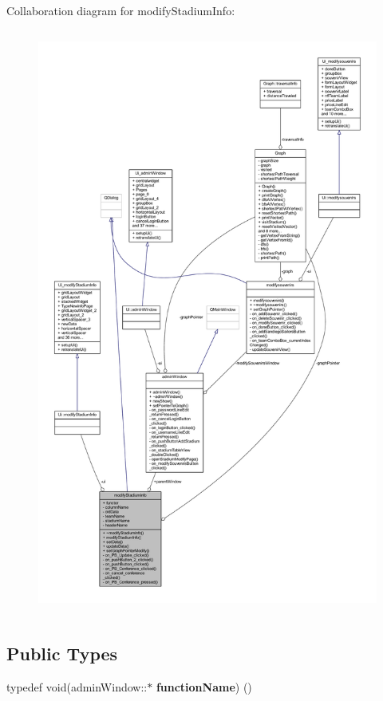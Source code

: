 Collaboration diagram for modify\+Stadium\+Info\+:\nopagebreak
\begin{figure}[H]
\begin{center}
\leavevmode
\includegraphics[height=550pt]{classmodify_stadium_info__coll__graph}
\end{center}
\end{figure}
\subsection*{Public Types}
\begin{DoxyCompactItemize}
\item 
\mbox{\label{classmodify_stadium_info_aa54c08275884b7295007eff22fa722cc}} 
typedef void(admin\+Window\+::$\ast$ {\bfseries function\+Name}) ()
\end{DoxyCompactItemize}
